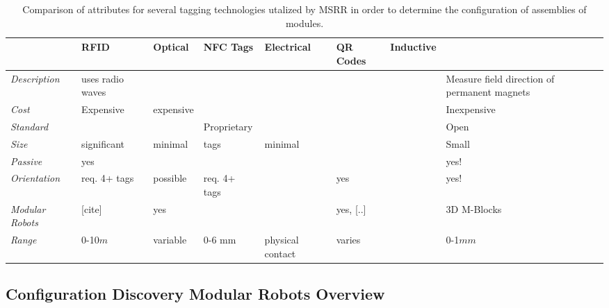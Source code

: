 \begin{table*}[t]
	\centering
	\caption{Comparison of attributes for several tagging technologies utalized by MSRR in order to determine the configuration of assemblies of modules.}
	\newcommand{\wdd}{1.9cm}
	\begin{tabular}{ p{1.7 cm} p{\wdd}  p{\wdd} p{\wdd} p{\wdd} p{\wdd} p{\wdd} p{\wdd}  }
		\hline
		\addlinespace[1ex]
											& RFID 				& Optical		& NFC Tags 		& Electrical 		& QR Codes 	& Inductive	& \bf{\tagNamePlural} \\ %
		\hline

		\textit{Description}				& uses radio waves	& 				& 				& 					& 	  		&			& Measure field direction of permanent magnets \\

\addlinespace[1ex]	 \textit{Cost}			& Expensive			& expensive		& 				& 					& 	 		&			& Inexpensive \\
		
\addlinespace[1ex] 	\textit{Standard}		& 					&  				& Proprietary	& 					& 			&			& Open \\
		
\addlinespace[1ex] 	\textit{Size} 			& significant 		& minimal 		& tags  		& minimal	  		&       	&			& Small		  \\
		
\addlinespace[1ex]	\textit{Passive} 		& yes				& 				&  				&	 				&			&			& yes!		  \\
		
\addlinespace[1ex] 	\textit{Orientation} 	& req. 4+ tags 		& possible 		& req. 4+ tags 	&	 				& yes		&			& yes!		\\
		
\addlinespace[1ex] 	\textit{Modular Robots}	& [cite]			& yes			&	  			& 					& yes, [..]	&	~\cite{TosunDaveyLiuYim-IROS2016}		& 3D M-Blocks\\
		
\addlinespace[1ex] 	\textit{Range}			& 0-10$m$			& variable		& 0-6 mm		& physical contact	& varies	&			& 0-1$mm$	\\
	\end{tabular}
	\label{tab:tagTech}
\end{table*}

\subsection{Configuration Discovery Modular Robots Overview}
\label{sec:RWconfiguration}
	
